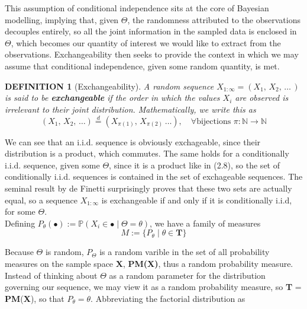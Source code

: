 \documentclass[12pt]{report}
\newtheorem{definition}[theorem]{DEFINITION}
\newcommand{\bs}{\boldsymbol}
\newcommand{\mb}[1]{\mathbb{#1}}
\renewcommand{\bs}{\boldsymbol}
\begin{document}
This assumption of conditional independence sits at the core of Bayesian modelling, implying that, given $\Theta$, the randomness attributed to the observations decouples entirely, so all the joint information in the sampled data is enclosed in $\Theta$, which becomes our quantity of interest we would like to extract from the observations. Exchangeability then seeks to provide the context in which we may assume that conditional independence, given some random quantity, is met. \\

\begin{definition}[Exchangeability]
    A random sequence $X_{1:\infty} = (X_1,\,X_2,\,\dots\,)$ is said to be \textbf{exchangeable} if the order in which the values $X_i$ are observed is irrelevant to their joint distribution. Mathematically, we write this as
    \begin{equation}
        (X_1,\,X_2,\,\dots) \overset{d}{=} (X_{\pi(1)},\,X_{\pi(2)}\,\dots),\quad \forall \text{bijections } \pi : \mb{N} \rightarrow \mb{N}
    \end{equation}
\end{definition}

We can see that an i.i.d. sequence is obviously exchageable, since their distribution is a product, which commutes. The same holds for a conditionally i.i.d. sequence, given some $\Theta$, since it is a product like in (2.8), so the set of conditionally i.i.d. sequences is contained in the set of exchageable sequences. The seminal result by de Finetti surprisingly proves that these two sets are actually equal, so a sequence $X_{1:\infty}$ is exchangeable if and only if it is conditionally i.i.d, for some $\Theta$. \\

Defining $P_\theta(\bullet) := \mb{P}(X_i \in \bullet \mid \Theta = \theta)$, we have a family of measures
\begin{equation}
    M := \{P_\theta \mid \theta \in \bs{T}\}
\end{equation}

Because $\Theta$ is random, $P_\Theta$ is a random varible in the set of all probability measures on the sample space $\bs{X}$, \textbf{PM(X)}, thus a random probability measure. Instead of thinking about $\Theta$ as a random parameter for the distribution governing our sequence, we may view it as a random probability measure, so \textbf{T} = \textbf{PM}(\textbf{X}), so that $P_\theta = \theta$. Abbreviating the factorial distribution as
\end{document}
